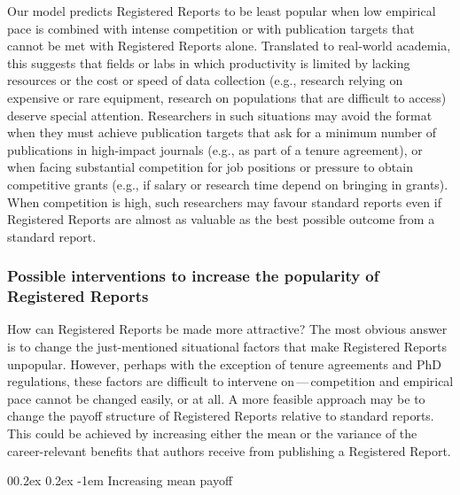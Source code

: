 \documentclass[
  ,man,mask,floatsintext]{apa6}
\makeatletter
\let\oldparagraph\paragraph
\renewcommand{\paragraph}[1]{\oldparagraph{#1}\mbox{}}
\renewcommand{\paragraph}{\@startsection{paragraph}{4}{\parindent}%
  {0\baselineskip \@plus 0.2ex \@minus 0.2ex}%
  {-1em}%
  {\normalfont\normalsize\bfseries\itshape\typesectitle}}
\makeatother
\begin{document}
Our model predicts Registered Reports to be least popular when low empirical pace is combined with intense competition or with publication targets that cannot be met with Registered Reports alone.
Translated to real-world academia, this suggests that fields or labs in which productivity is limited by lacking resources or the cost or speed of data collection (e.g., research relying on expensive or rare equipment, research on populations that are difficult to access) deserve special attention.
Researchers in such situations may avoid the format when they must achieve publication targets that ask for a minimum number of publications in high-impact journals (e.g., as part of a tenure agreement), or when facing substantial competition for job positions or pressure to obtain competitive grants (e.g., if salary or research time depend on bringing in grants).
When competition is high, such researchers may favour standard reports even if Registered Reports are almost as valuable as the best possible outcome from a standard report.

\hypertarget{possible-interventions-to-increase-the-popularity-of-registered-reports}{%
\subsubsection{Possible interventions to increase the popularity of Registered Reports}\label{possible-interventions-to-increase-the-popularity-of-registered-reports}}

How can Registered Reports be made more attractive?
The most obvious answer is to change the just-mentioned situational factors that make Registered Reports unpopular.
However,
perhaps with the exception of tenure agreements and PhD regulations, these
factors are difficult to intervene on\(\,\)---\(\,\)competition and empirical pace cannot be changed easily, or at all.
A more feasible approach may be to change the payoff structure of Registered Reports relative to standard reports.
This could be achieved by increasing either the mean or the variance of the career-relevant benefits that authors receive from publishing a Registered Report.

\hypertarget{increasing-mean-payoff}{%
\paragraph{Increasing mean payoff}\label{increasing-mean-payoff}}
\end{document}
